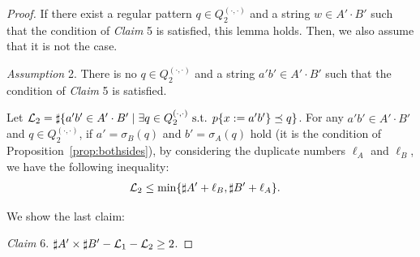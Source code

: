 \begin{proof}
\noindent
If there exist a regular pattern $q \in Q_{2}^{(\cdot,\cdot)}$ and a string $w \in A'\cdot B'$ such that the condition of \textit{Claim} 5 is satisfied, this lemma holds. Then, we also assume that it is not the case.

\smallskip

\noindent
\textit{Assumption} 2.
There is no $q \in Q_{2}^{(\cdot,\cdot)}$ and a string $a'b' \in A'\cdot B'$ such that the condition of \textit{Claim} 5 is satisfied.

\smallskip

\noindent
Let ${\cal L}_{2} = \sharp\{a'b' \in A'\cdot B' \mid \exists q \in Q_{2}^{(\cdot,\cdot)} \mbox{ s.t. } p\{x:=a'b'\} \preceq q\}$.
For any $a'b' \in A'\cdot B'$ and $q \in Q_{2}^{(\cdot,\cdot)}$, if $a' = \sigma_{B}(q)$ and $b' = \sigma_{A}(q)$ hold (it is the condition of Proposition~\ref{prop:bothsides}), by considering the duplicate numbers $\ell_{A}$ and $\ell_{B}$, we have the following inequality:
\begin{align*}
  {\cal L}_{2} &\leq \min\{\sharp A' + \ell_{B}, \sharp B' + \ell_{A}\}.
\end{align*}

We show the last claim:
  
\smallskip

\noindent
\textit{Claim} 6. 
$\sharp A' \times \sharp B' - {\cal L}_{1} - {\cal L}_{2} \geq 2$.

\smallskip


\end{proof}

